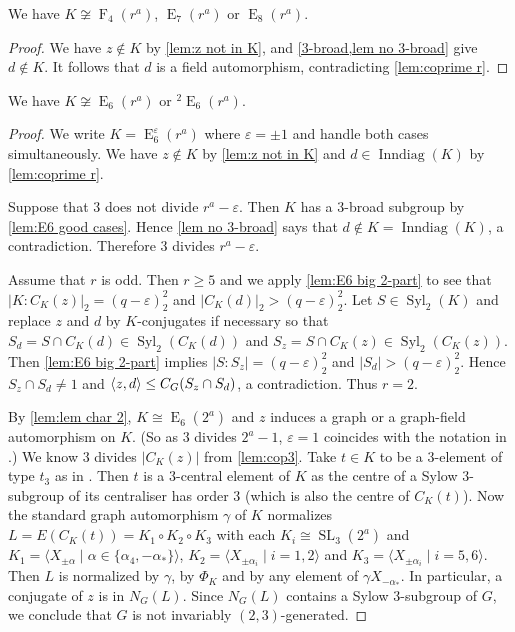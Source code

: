 \documentclass[12pt,a4paper]{amsart}
\DeclareMathOperator{\Inndiag}{Inndiag}
\DeclareMathOperator{\Syl}{Syl}
\DeclareMathOperator{\syl}{Syl}
\DeclareMathOperator{\E}{E}
\DeclareMathOperator{\F}{F}
\DeclareMathOperator{\SL}{SL}
\renewcommand{\epsilon}{\varepsilon}
\newcommand{\eps}{\epsilon}
\DeclarePairedDelimiter{\gen}{\langle}{\rangle}
\begin{document}
\begin{lemma} \label{lem:not E7 E8 or F4} We have $K \not \cong \F_4(r^a)$, $\E_7(r^a)$ or $\E_8(r^a)$.
\end{lemma}

\begin{proof}   We have $z \not \in K$ by \cref{lem:z not in K}, and \cref{3-broad,lem no 3-broad} give $d \not \in K$. It follows that $d$ is a field automorphism, contradicting \cref{lem:coprime r}.
\end{proof}







  \begin{lemma}\label{lem:not E6}  We have  $K \not \cong \E_6(r^a)$ or ${}^2\E_6(r^a)$.
  \end{lemma}

\begin{proof} We write $K=\E_6^\eps(r^a)$ where $\eps =\pm 1 $ and handle both cases simultaneously. We have $z \not \in K$ by \cref{lem:z not in K} and $d \in \Inndiag(K)$ by \cref{lem:coprime r}.

Suppose that $3$ does not divide $r^a-\eps$.
Then $K$ has a $3$-broad subgroup  by \cref{lem:E6 good cases}.   Hence \cref{lem no 3-broad} says that $d \not \in K=\Inndiag(K)$, a contradiction. Therefore $3$  divides $r^a-\eps$.

Assume that $r$ is odd. Then $r \ge 5$ and we apply \cref{lem:E6 big 2-part} to see that $|K:C_K(z)|_2= (q-\eps)^2_2$  and $|C_K(d)|_2> (q-\eps)^2_2$.  Let $S \in \Syl_2(K)$ and  replace  $z$ and $d$ by $K$-conjugates if necessary  so that $S_d=S \cap C_K(d) \in\Syl_2(C_K(d))$ and $S_z=S \cap C_K(z) \in \syl_2(C_K(z))$. Then  \cref{lem:E6 big 2-part} implies $|S:S_z|=  (q-\eps)^2_2$  and $|S_d|> (q-\eps)^2_2$. Hence $S_z\cap S_d \ne 1$ and $\gen{z,d}\le C_G(S_z\cap S_d)$, a contradiction. Thus $r=2$.


 By \cref{lem:lem char 2},
 $K\cong \E_6(2^a)$  and $z$ induces a graph or a graph-field automorphism on $K$. (So as $3$ divides $2^a-1$, $\epsilon =1$ coincides with the notation in \cite[Table 4.7.3A]{GLS3}.)
   We know $3$ divides $|C_K(z)|$ from \cref{lem:cop3}.  Take $t\in K$ to be a $3$-element of type $t_3$ as in \cite[Table 4.7.3A]{GLS3}. Then $t$ is a $3$-central element of $K$ as the centre of a Sylow $3$-subgroup of its centraliser has order $3$ (which is also the centre of  $C_K(t)$).
Now the  standard graph automorphism $\gamma$ of $K$ normalizes $L=E(C_K(t))=K_1\circ K_2\circ K_3$ with each $K_i\cong \SL_3(2^a)$ and $K_1=\langle  X_{\pm\alpha}\mid  \alpha\in\{\alpha_4,-\alpha_*\}\rangle$, $K_2=\langle X_{\pm\alpha_i}\mid i=1,2\rangle$ and $K_3=\langle X_{\pm\alpha_i}\mid i=5,6\rangle$. Then $L$ is normalized by $\gamma$, by $\Phi_K$ and by any element of $\gamma X_{-\alpha_*}$. In particular,   a conjugate of $z$ is in $N_G(L)$. Since $N_G(L)$ contains a Sylow $3$-subgroup of $G$, we conclude that $G$ is not invariably $(2,3)$-generated.
\end{proof}
\end{document}
